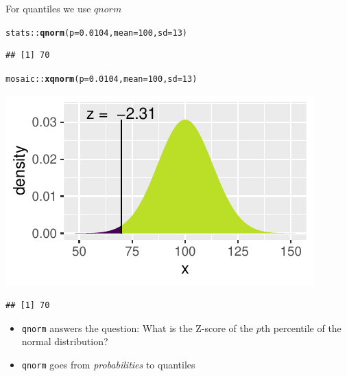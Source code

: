 \documentclass[10pt]{beamer}\usepackage[]{graphicx}\usepackage[]{color}
\makeatletter
\newcommand{\hlnum}[1]{\textcolor[rgb]{0.686,0.059,0.569}{#1}}%
\newcommand{\hlopt}[1]{\textcolor[rgb]{0,0,0}{#1}}%
\newcommand{\hlstd}[1]{\textcolor[rgb]{0.345,0.345,0.345}{#1}}%
\newcommand{\hlkwc}[1]{\textcolor[rgb]{0.333,0.667,0.333}{#1}}%
\newcommand{\hlkwd}[1]{\textcolor[rgb]{0.737,0.353,0.396}{\textbf{#1}}}%
\newenvironment{kframe}{%
 \def\at@end@of@kframe{}%
 \ifinner\ifhmode%
  \def\at@end@of@kframe{\end{minipage}}%
  \begin{minipage}{\columnwidth}%
 \fi\fi%
 \def\FrameCommand##1{\hskip\@totalleftmargin \hskip-\fboxsep
 \colorbox{shadecolor}{##1}\hskip-\fboxsep
     \hskip-\linewidth \hskip-\@totalleftmargin \hskip\columnwidth}%
 \MakeFramed {\advance\hsize-\width
   \@totalleftmargin\z@ \linewidth\hsize
   \@setminipage}}%
 {\par\unskip\endMakeFramed%
 \at@end@of@kframe}
\newenvironment{knitrout}{}{} %
\makeatother
\begin{document}
\begin{frame}[fragile]{For quantiles we use $qnorm$}
	
	
	
\begin{knitrout}\tiny
{}\color{fgcolor}\begin{kframe}
\begin{alltt}
\hlstd{stats}\hlopt{::}\hlkwd{qnorm}\hlstd{(}\hlkwc{p} \hlstd{=} \hlnum{0.0104}\hlstd{,} \hlkwc{mean} \hlstd{=} \hlnum{100}\hlstd{,} \hlkwc{sd} \hlstd{=} \hlnum{13}\hlstd{)}
\end{alltt}
\begin{verbatim}
## [1] 70
\end{verbatim}
\end{kframe}
\end{knitrout}
	
	\pause 
	
\begin{knitrout}\tiny
{}\color{fgcolor}\begin{kframe}
\begin{alltt}
\hlstd{mosaic}\hlopt{::}\hlkwd{xqnorm}\hlstd{(}\hlkwc{p} \hlstd{=} \hlnum{0.0104}\hlstd{,} \hlkwc{mean} \hlstd{=} \hlnum{100}\hlstd{,} \hlkwc{sd} \hlstd{=} \hlnum{13}\hlstd{)}
\end{alltt}
\end{kframe}

{\centering \includegraphics[width=0.6\linewidth]{figure/probs5-1} 

}


\begin{kframe}\begin{verbatim}
## [1] 70
\end{verbatim}
\end{kframe}
\end{knitrout}
	
	\pause 
	
	\small{
		\begin{itemize}
			\item \texttt{qnorm} answers the question: What is the Z-score of the $p$th percentile of the normal distribution?
			
			\item \texttt{qnorm} goes from \textit{probabilities} to quantiles 
		\end{itemize}
	}
\end{frame}
\end{document}
